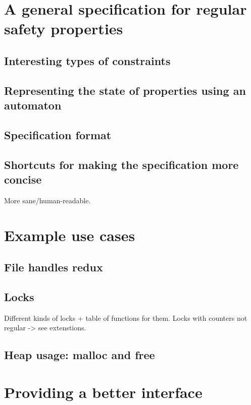 \chapter{A general specification for regular safety properties}
\section{Interesting types of constraints}

\section{Representing the state of properties using an automaton}

\section{Specification format}

\section{Shortcuts for making the specification more concise}
More sane/human-readable.


\chapter{Example use cases}

\section{File handles redux}

\section{Locks}
Different kinds of locks + table of functions for them.
Locks with counters not regular -> see extenstions.

\section{Heap usage: malloc and free}


\chapter{Providing a better interface}
